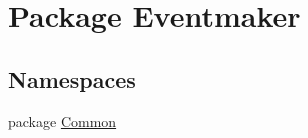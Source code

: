 \hypertarget{namespace_eventmaker}{}\section{Package Eventmaker}
\label{namespace_eventmaker}
\subsection*{Namespaces}
\begin{DoxyCompactItemize}
\item 
package \hyperlink{namespace_eventmaker_1_1_common}{Common}
\end{DoxyCompactItemize}
